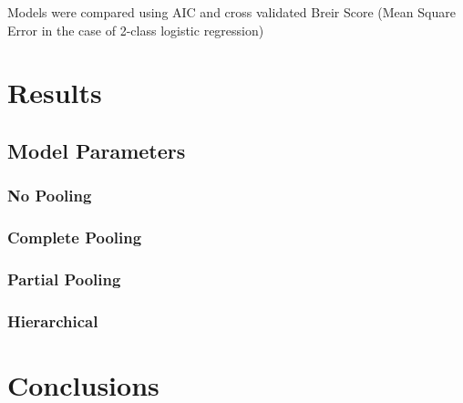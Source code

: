 \documentclass{IEEEtran}
\begin{document}
Models were compared using AIC and cross validated Breir Score (Mean Square Error in the case of 2-class logistic regression)

\section{Results}

\subsection{Model Parameters}

\subsubsection{No Pooling}

\subsubsection{Complete Pooling}

\subsubsection{Partial Pooling}

\subsubsection{Hierarchical}



\section{Conclusions}
\end{document}
